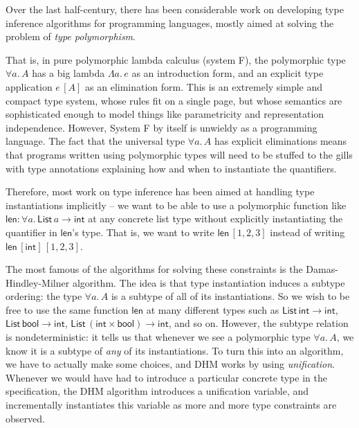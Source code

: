 
Over the last half-century, there has been considerable work on developing type inference algorithms for programming languages,  mostly aimed at solving the problem of \emph{type polymorphism}.

That is, in pure polymorphic lambda calculus (system F), the polymorphic type $\forall a.\,A$ has a big lambda $\Lambda a.\,e$ as an introduction form, and an explicit type application $e\,[A]$ as an elimination form. This is an extremely simple and compact type system, whose rules fit on a single page, but whose semantics are sophisticated enough to model things like parametricity and representation independence. However, System F by itself is unwieldy as a programming language. The fact that the universal type $\forall a.\,A$ has explicit eliminations means that programs written using polymorphic types will need to be stuffed to the gills with type annotations explaining how and when to instantiate the quantifiers.

Therefore, most work on type inference has been aimed at handling type instantiations implicitly -- we want to be able to use a polymorphic function like $\mathsf{len} : \forall a.\, \mathsf{List}\,a \to \mathsf{int}$ at any concrete list type without explicitly instantiating the quantifier in $\mathsf{len}$'s type. That is, we want to write $\mathsf{len}\,[1,2,3]$ instead of writing $\mathsf{len}\,[\mathsf{int}]\,[1,2,3]$. 

The most famous of the algorithms for solving these constraints is the Damas-Hindley-Milner algorithm. The idea is that type instantiation induces a subtype ordering: the type $\forall a.\,A$ is a subtype of all of its instantiations. So we wish to be free to use the same function $\mathsf{len}$ at many different types such as
$\mathsf{List}\,\mathsf{int} \to \mathsf{int}$,
$\mathsf{List}\,\mathsf{bool} \to \mathsf{int}$,
$\mathsf{List}\,(\mathsf{int \times bool}) \to \mathsf{int}$, and so on. However, the subtype relation is nondeterministic: it tells us that whenever we see a polymorphic type $\forall a.\, A$, we know it is a subtype of \emph{any} of its instantiations. To turn this into an algorithm, we have to actually make some choices, and DHM works by using \emph{unification}. Whenever we would have had to introduce a particular concrete type in the specification, the DHM algorithm introduces a unification variable, and incrementally instantiates this variable as more and more type constraints are observed.

